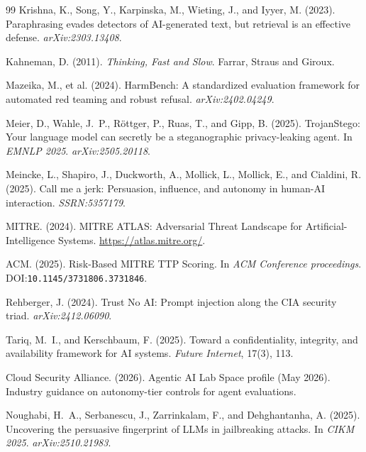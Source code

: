 \documentclass[12pt]{article}
\begin{document}
\begin{thebibliography}{99}
Krishna, K., Song, Y., Karpinska, M., Wieting, J., and Iyyer, M. (2023).
Paraphrasing evades detectors of AI-generated text, but retrieval is an
effective defense.
\textit{arXiv:2303.13408}.

Kahneman, D. (2011).
\textit{Thinking, Fast and Slow}.
Farrar, Straus and Giroux.

Mazeika, M., et al. (2024).
HarmBench: A standardized evaluation framework for automated red teaming and
robust refusal.
\textit{arXiv:2402.04249}.

Meier, D., Wahle, J.~P., R\"ottger, P., Ruas, T., and Gipp, B. (2025).
TrojanStego: Your language model can secretly be a steganographic
privacy-leaking agent.
In \textit{EMNLP 2025}. \textit{arXiv:2505.20118}.

Meincke, L., Shapiro, J., Duckworth, A., Mollick, L., Mollick, E., and
Cialdini, R. (2025).
Call me a jerk: Persuasion, influence, and autonomy in human-AI interaction.
\textit{SSRN:5357179}.

MITRE. (2024).
MITRE ATLAS: Adversarial Threat Landscape for Artificial-Intelligence Systems.
\url{https://atlas.mitre.org/}.

ACM. (2025).
Risk-Based MITRE TTP Scoring.
In \textit{ACM Conference proceedings}.
DOI:\texttt{10.1145/3731806.3731846}.

Rehberger, J. (2024).
Trust No AI: Prompt injection along the CIA security triad.
\textit{arXiv:2412.06090}.

Tariq, M.~I., and Kerschbaum, F. (2025).
Toward a confidentiality, integrity, and availability framework for AI systems.
\textit{Future Internet}, 17(3), 113.

Cloud Security Alliance. (2026).
Agentic AI Lab Space profile (May 2026).
Industry guidance on autonomy-tier controls for agent evaluations.

Noughabi, H.~A., Serbanescu, J., Zarrinkalam, F., and Dehghantanha, A. (2025).
Uncovering the persuasive fingerprint of LLMs in jailbreaking attacks.
In \textit{CIKM 2025}. \textit{arXiv:2510.21983}.


\end{thebibliography}
\end{document}
